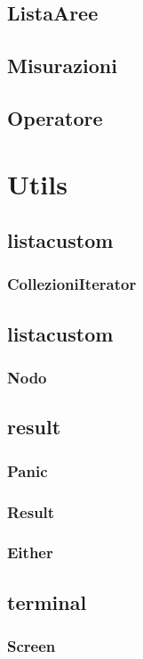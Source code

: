 \documentclass[a4paper, 12pt]{report}
\begin{document}
			\subsection{ListaAree}
			\subsection{Misurazioni}
			\subsection{Operatore}

		\section{Utils}
			\subsection{listacustom}
				\subsubsection{CollezioniIterator}
			\subsection{listacustom}
				\subsubsection{Nodo}
			\subsection{result}
				\subsubsection{Panic}
				\subsubsection{Result}
				\subsubsection{Either}

			\subsection{terminal}
				\subsubsection{Screen}
\end{document}
